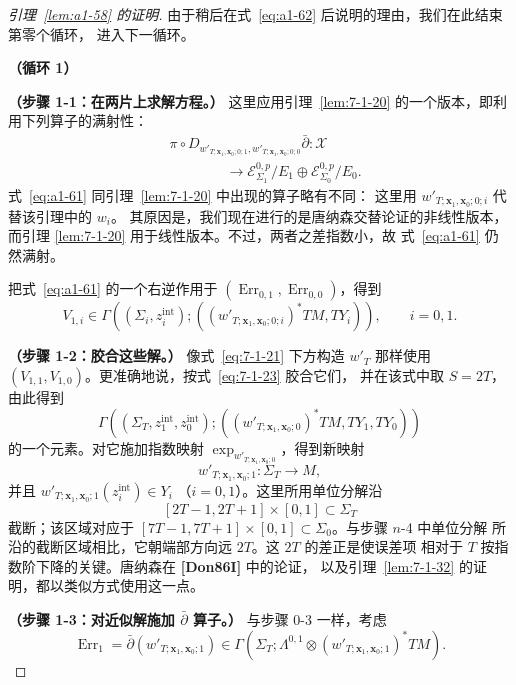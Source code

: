 \begin{proof}[引理~\ref{lem:a1-58} 的证明]
由于稍后在式~\eqref{eq:a1-62} 后说明的理由，我们在此结束第零个循环，
进入下一循环。

\medskip\noindent\textbf{（循环 1）}

\smallskip\noindent\textbf{（步骤 1-1：在两片上求解方程。）}
这里应用引理~\ref{lem:7-1-20} 的一个版本，即利用下列算子的满射性：
\begin{equation}
 \begin{aligned}
 &\pi\circ
 D_{w'_{T;\mathbf x_1,\mathbf x_0;0;1},
   w'_{T;\mathbf x_1,\mathbf x_0;0;0}}
 \bar\partial\colon\mathcal X\\
 &\hspace{4em}\longrightarrow
 \mathcal E^{0,p}_{\Sigma_1}/E_1
 \oplus
 \mathcal E^{0,p}_{\Sigma_0}/E_0.
 \end{aligned}
\tag{A1.61}\label{eq:a1-61}
\end{equation}
式~\eqref{eq:a1-61} 同引理~\ref{lem:7-1-20} 中出现的算子略有不同：
这里用 $w'_{T;\mathbf x_1,\mathbf x_0;0;i}$ 代替该引理中的 $w_i$。
其原因是，我们现在进行的是唐纳森交替论证的非线性版本，而引理
\ref{lem:7-1-20} 用于线性版本。不过，两者之差指数小，故
式~\eqref{eq:a1-61} 仍然满射。

把式~\eqref{eq:a1-61} 的一个右逆作用于
$(\operatorname{Err}_{0,1},\operatorname{Err}_{0,0})$，得到
\[
 V_{1,i}\in
 \Gamma\!\left(
 (\Sigma_i,z_i^{\mathrm{int}});
 ((w'_{T;\mathbf x_1,\mathbf x_0;0;i})^*TM,TY_i)
 \right),
 \qquad i=0,1.
\]

\smallskip\noindent\textbf{（步骤 1-2：胶合这些解。）}
像式~\eqref{eq:7-1-21} 下方构造 $w'_T$ 那样使用
$(V_{1,1},V_{1,0})$。更准确地说，按式~\eqref{eq:7-1-23} 胶合它们，
并在该式中取 $S=2T$，由此得到
\[
 \Gamma\!\left(
 (\Sigma_T,z_1^{\mathrm{int}},z_0^{\mathrm{int}});
 ((w'_{T;\mathbf x_1,\mathbf x_0;0})^*TM,TY_1,TY_0)
 \right)
\]
的一个元素。对它施加指数映射
$\exp_{w'_{T;\mathbf x_1,\mathbf x_0;0}}$，得到新映射
\[
 w'_{T;\mathbf x_1,\mathbf x_0;1}\colon\Sigma_T\longrightarrow M,
\]
并且
$w'_{T;\mathbf x_1,\mathbf x_0;1}(z_i^{\mathrm{int}})\in Y_i$
（$i=0,1$）。这里所用单位分解沿
\[
 [2T-1,2T+1]\times[0,1]\subset\Sigma_T
\]
截断；该区域对应于
$[7T-1,7T+1]\times[0,1]\subset\Sigma_0$。与步骤 $n$-4 中单位分解
所沿的截断区域相比，它朝端部方向远 $2T$。这 $2T$ 的差正是使误差项
相对于 $T$ 按指数阶下降的关键。唐纳森在 \textbf{[Don86I]} 中的论证，
以及引理~\ref{lem:7-1-32} 的证明，都以类似方式使用这一点。

\smallskip\noindent\textbf{（步骤 1-3：对近似解施加
$\bar\partial$ 算子。）}
与步骤 0-3 一样，考虑
\[
 \operatorname{Err}_1
 =\bar\partial(w'_{T;\mathbf x_1,\mathbf x_0;1})
 \in
 \Gamma\!\left(
 \Sigma_T;\Lambda^{0,1}\otimes
 (w'_{T;\mathbf x_1,\mathbf x_0;1})^*TM
 \right).
\]


\end{proof}
